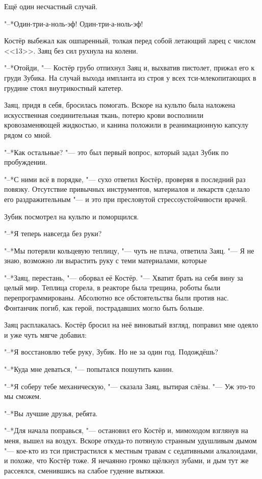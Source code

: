 \documentclass[a4paper,10pt]{book}
\newcommand{\ldotst}{\so{...}\xspace}
\begin{document}
Ещё один несчастный случай.

"--*Один-три-а-ноль-эф! Один-три-а-ноль-эф!

Костёр выбежал как ошпаренный, толкая перед собой летающий ларец с числом 
<<13>>. Заяц без сил рухнула на колени.

"--*Отойди, "--- Костёр грубо отпихнул Заяц и, выхватив пистолет, прижал его к 
груди Зубика. На случай выхода импланта из строя у всех тси-млекопитающих в 
грудине стоял внутрикостный катетер.

Заяц, придя в себя, бросилась помогать. Вскоре на культю была наложена 
искусственная соединительная ткань, потерю крови восполнили кровозаменяющей 
жидкостью, и канина положили в реанимационную капсулу рядом со мной.

"--*Как остальные? "--- это был первый вопрос, который задал Зубик по 
пробуждении.

"--*С ними всё в порядке, "--- сухо ответил Костёр, проверяя в последний раз 
повязку. Отсутствие привычных инструментов, материалов и лекарств сделало его 
раздражительным "--- и это при пресловутой стрессоустойчивости врачей.

Зубик посмотрел на культю и поморщился.

"--*Я теперь навсегда без руки?

"--*Мы потеряли кольцевую теплицу, "--- чуть не плача, ответила Заяц. "--- Я не 
знаю, возможно ли вырастить руку с теми материалами, которые\ldotst

"--*Заяц, перестань, "--- оборвал её Костёр. "--- Хватит брать на себя вину за 
целый мир. Теплица сгорела, в реакторе была трещина, роботы были 
перепрограммированы. Абсолютно все обстоятельства были против нас. Фонтанчик
погиб, как герой, пострадавших могло быть больше.

Заяц расплакалась. Костёр бросил на неё виноватый взгляд, поправил мне одеяло и 
уже чуть мягче добавил:

"--*Я восстановлю тебе руку, Зубик. Но не за один год. Подождёшь?

"--*Куда мне деваться, "--- попытался пошутить канин.

"--*Я соберу тебе механическую, "--- сказала Заяц, вытирая слёзы. "--- Уж 
это-то 
мы сможем.

"--*Вы лучшие друзья, ребята.

"--*Для начала поправься, "--- остановил его Костёр и, мимоходом взглянув на 
меня, вышел на воздух. Вскоре откуда-то потянуло странным удушливым дымом "--- 
кое-кто из тси пристрастился к местным травам с седативными алкалоидами, и 
похоже, что Костёр тоже. Я нечаянно громко щёлкнул зубами, и дым тут же 
рассеялся, сменившись на слабое гудение вытяжки.
\end{document}

